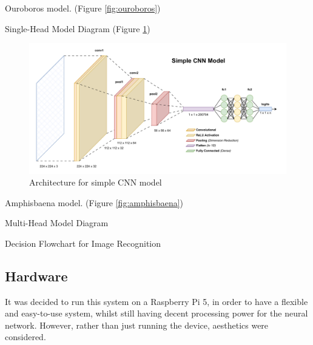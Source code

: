                 Ouroboros model. (Figure \ref{fig:ouroboros})
                
                \begin{temp}
                    Single-Head Model Diagram (Figure \ref{fig:BabyOuroboros})
                \end{temp}
    
                \begin{figure}[htbp]
                    \centering
                    \includegraphics[width=\linewidth]{images/BabyOuroboros.pdf}
                    \caption{Architecture for simple CNN model}
                    \label{fig:BabyOuroboros}
                \end{figure}
    
                Amphisbaena model. (Figure \ref{fig:amphisbaena})
    
                \begin{temp}
                    Multi-Head Model Diagram
                \end{temp}
    
                \begin{temp}
                    Decision Flowchart for Image Recognition
                \end{temp}
        
        \subsection{Hardware}
    
            It was decided to run this system on a Raspberry Pi 5, in order to have a flexible and easy-to-use system, whilst still having decent processing power for the neural network. However, rather than just running the device, aesthetics were considered.
    
